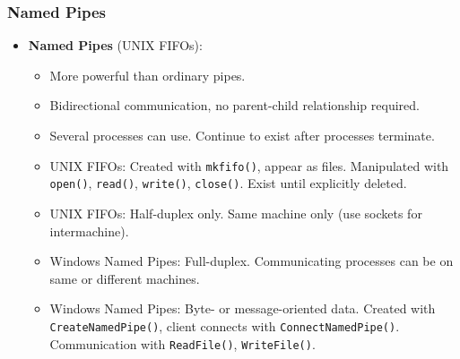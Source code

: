 \subsubsection{Named Pipes}
\begin{itemize}
            \item \textbf{Named Pipes} (UNIX FIFOs):
                \begin{itemize}
                    \item More powerful than ordinary pipes.
                    \item Bidirectional communication, no parent-child relationship required.
                    \item Several processes can use. Continue to exist after processes terminate.
                    \item UNIX FIFOs: Created with \texttt{mkfifo()}, appear as files. Manipulated with \texttt{open()}, \texttt{read()}, \texttt{write()}, \texttt{close()}. Exist until explicitly deleted.
                    \item UNIX FIFOs: Half-duplex only. Same machine only (use sockets for intermachine).
                    \item Windows Named Pipes: Full-duplex. Communicating processes can be on same or different machines.
                    \item Windows Named Pipes: Byte- or message-oriented data. Created with \texttt{CreateNamedPipe()}, client connects with \texttt{ConnectNamedPipe()}. Communication with \texttt{ReadFile()}, \texttt{WriteFile()}.
                \end{itemize}
        \end{itemize}
